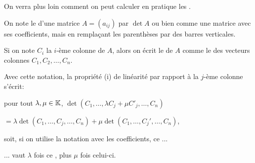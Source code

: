 On verra plus loin comment on
peut calculer en pratique les \deters.

\diapo

On note le  \deter d'une matrice $A = (a_{ij})$ par $\det A$ ou bien comme une matrice 
avec ses coefficients, mais en remplaçant
les parenthèses par des barres verticales.

\change
Si on note $C_{i}$ la $i$-ème colonne de $A$, alors on écrit le \deter de $A$ 
comme le \deter des vecteurs colonnes $C_1,C_2,\ldots,C_n$.


\diapo

Avec cette notation, la propriété (i) de linéarité par rapport à la $j$-ème colonne s'écrit:

\change
pour tout $\lambda,\mu \in \mathbb{K}$,  $\det (C_1,\ldots,\lambda C_j + \mu C'_j,\ldots, C_n) $

\change
$= \lambda  \det (C_1,\ldots,C_j,\ldots, C_n)+ \mu \det (C_1,\ldots,C_j',\ldots, C_n)$,

\change
soit, si on utilise la notation avec les coefficients, ce \deter...

\change
... vaut $\lambda$ fois ce \deter, plus $\mu$ fois celui-ci.




